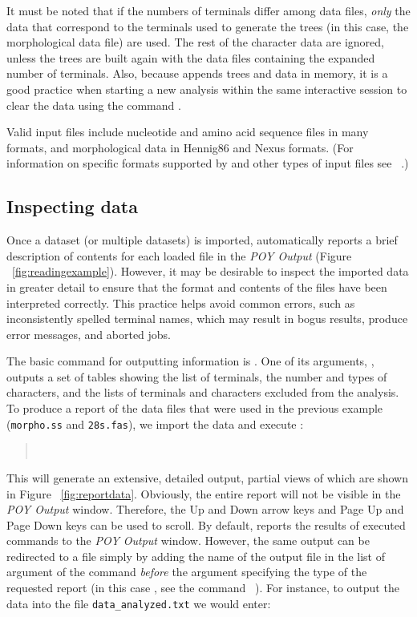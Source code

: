 {It must be noted that if the numbers of terminals differ among data
files, \emph{only} the data that correspond to the terminals used
to generate the trees (in this case, the morphological data file)
are used. The rest of the character data are ignored, unless the
trees are built again with the data files containing the expanded
number of terminals.  Also, because \poy appends trees and data in
memory, it is a good practice when starting a new analysis within
the same interactive session to clear the data using the command 
.

Valid input files include nucleotide and amino acid sequence files
in many formats, and morphological data in Hennig86 and Nexus
formats. (For information on specific formats supported by \poy and
other types of input files see ~.)

\subsection{Inspecting data}

Once a dataset (or multiple datasets) is imported, \poy automatically
reports a brief description of contents for each loaded file in the
\emph{POY Output} (Figure ~\ref{fig:readingexample}). However, it
may be desirable to inspect the imported data in greater detail to
ensure that the format and contents of the files have been interpreted
correctly. This practice helps avoid common errors, such as
inconsistently spelled terminal names, which may result in bogus
results, produce error messages, and aborted jobs.

The basic command for outputting information is .
One of its arguments, , outputs a set of tables
showing the list of terminals, the number and types of characters,
and the lists of terminals and characters excluded from the analysis.
To produce a report of the data files that were used in the previous
example (\texttt{morpho.ss} and \texttt{28s.fas}), we import the
data and execute :

\begin{quote}
\\
\end{quote}

This will generate an extensive, detailed output, partial views of
which are shown in Figure ~\ref{fig:reportdata}.  Obviously, the
entire report will not be visible in the \emph{POY Output} window.
Therefore, the Up and Down arrow keys and Page Up and Page Down
keys can be used to scroll.  By default, \poy reports the results
of executed commands to the \emph{POY Output} window. However, the
same output can be redirected to a file simply by adding the name
of the output file in the list of argument of the command
 \emph{before} the argument specifying the
type of the requested report (in this case , see
the command~ ). For instance, to output the data
into the file \texttt{data\_analyzed.txt} we would enter:

}
